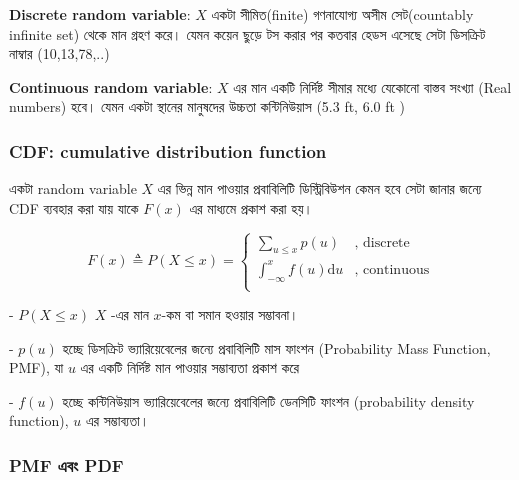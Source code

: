 \documentclass[graybox, envcountchap, twocolumn]{styles/svmult}
\begin{document}
{\bengalifont
\textbf{Discrete random variable}: $X$ একটা সীমিত(finite) গণনাযোগ্য অসীম সেট(countably infinite set) থেকে মান গ্রহণ করে। যেমন কয়েন ছুড়ে টস করার পর কতবার হেডস এসেছে সেটা ডিসক্রিট নাম্বার (10,13,78,..)


\textbf{Continuous random variable}:  $X$ এর মান একটি নির্দিষ্ট সীমার মধ্যে যেকোনো বাস্তব সংখ্যা (Real numbers) হবে। যেমন একটা স্থানের মানুষদের উচ্চতা কন্টিনিউয়াস (5.3 ft, 6.0 ft )}



\subsubsection{CDF: cumulative distribution function}
{\bengalifont একটা random variable} $X$ {\bengalifont এর ভিন্ন মান পাওয়ার প্রবাবিলিটি ডিস্ট্রিবিউশন কেমন হবে সেটা জানার জন্যে CDF ব্যবহার করা যায় যাকে} $𝐹(𝑥)$ {\bengalifont এর মাধ্যমে প্রকাশ করা হয়। }

\begin{equation}
F(x) \triangleq P(X \leq x)=\begin{cases}
\sum_{u \leq x}p(u) & \text{, discrete}\\
\int_{-\infty}^{x} f(u)\mathrm{d}u & \text{, continuous}\\
\end{cases}
\end{equation}


- $  P(X \leq x) $ $X$ -{\bengalifont এর মান} $x$-{ কম বা সমান হওয়ার সম্ভাবনা।}

- $p(u)$ {\bengalifont হচ্ছে ডিসক্রিট ভ্যারিয়েবেলের জন্যে  প্রবাবিলিটি মাস ফাংশন (Probability Mass Function, PMF), যা $u$ এর একটি নির্দিষ্ট মান পাওয়ার সম্ভাব্যতা প্রকাশ করে }

- $ f(u)$ {\bengalifont হচ্ছে কন্টিনিউয়াস ভ্যারিয়েবেলের জন্যে প্রবাবিলিটি ডেনসিটি ফাংশন (probability density function), $u$ এর সম্ভাব্যতা। } 



\subsubsection{PMF {\bengalifont এবং} PDF}
\end{document}
